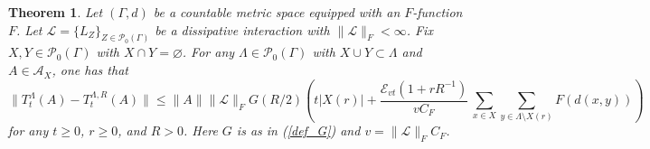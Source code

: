 \documentclass{article}
\newcommand{\E}{\mathscr{E}}
\newcommand{\<}{\langle}
\renewcommand{\>}{\rangle}
\let\emptyset\varnothing
\numberwithin{equation}{section}
\newtheorem{thm}{Theorem}[section]
\theoremstyle{definition}
\begin{document}
\begin{thm}\label{thm:dyn_diff}
Let $(\Gamma, d)$ be a countable metric space equipped with an $F$-function $F$.
Let $\mathscr{L}= \{ L_Z \}_{Z \in \mathcal{P}_0(\Gamma)}$ be a dissipative interaction with $\| \mathscr{L} \|_F< \infty$. 
Fix $X,Y \in \mathcal{P}_0(\Gamma)$ with $X \cap Y = \emptyset$. 
For any $\Lambda \in \mathcal{P}_0( \Gamma)$ with $X \cup Y \subset \Lambda$ and $A \in \mathcal{A}_X$, one has that 
 \begin{equation}\label{dyn_diff_est}
        \|T^{\Lambda}_t(A) -T^{\Lambda, R}_t(A) \|  \leq \|A\| \| \mathscr{L} \|_F G(R/2) \left( t |X(r)| + \frac{\E_{vt}(1+ rR^{-1})}{v C_F} \,
        \sum_{x \in X} \sum_{y \in \Lambda \setminus X(r)} F(d(x,y)) \right)
    \end{equation} 
for any $t \geq 0$, $r \geq 0$, and $R>0$. Here $G$ is as in (\ref{def_G}) and $v = \| \mathscr{L} \|_F C_F$. 
\end{thm}
\end{document}
